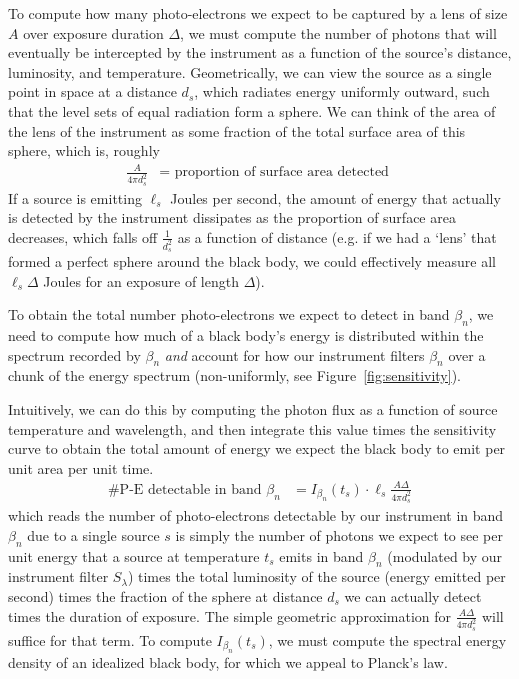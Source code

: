 \documentclass[11pt]{article}
\begin{document}
To compute how many photo-electrons we expect to be captured by a lens of size $A$ over exposure duration $\Delta$, we must compute the number of photons that will eventually be intercepted by the instrument as a function of the source's distance, luminosity, and temperature.  Geometrically, we can view the source as a single point in space at a distance $d_s$, which radiates energy uniformly outward, such that the level sets of equal radiation form a sphere.  We can think of the area of the lens of the instrument as some fraction of the total surface area of this sphere, which is, roughly
\begin{align}
  \frac{A}{4\pi d_s^2} &= \text{ proportion of surface area detected }
\end{align}
If a source is emitting $\ell_s$ Joules per second, the amount of energy that actually is detected by the instrument dissipates as the proportion of surface area decreases, which falls off $\frac{1}{d_s^2}$ as a function of distance (e.g. if we had a `lens' that formed a perfect sphere around the black body, we could effectively measure all $\ell_s \Delta$ Joules for an exposure of length $\Delta$).  

To obtain the total number photo-electrons we expect to detect in band $\beta_n$, we need to compute how much of a black body's energy is distributed within the spectrum recorded by $\beta_n$ \emph{and} account for how our instrument filters $\beta_n$ over a chunk of the energy spectrum (non-uniformly, see Figure~\ref{fig:sensitivity}).

Intuitively, we can do this by computing the photon flux as a function of source temperature and wavelength, and then integrate this value times the sensitivity curve to obtain the total amount of energy we expect the black body to emit per unit area per unit time.  
\begin{align}
  \text{\# P-E detectable in band $\beta_n$} &= I_{\beta_n}(t_s) \cdot \ell_s \frac{A \Delta}{4\pi d_s^2}  
  \label{eq:brightness}
\end{align}
which reads the number of photo-electrons detectable by our instrument in band $\beta_n$ due to a single source $s$ is simply the number of photons we expect to see per unit energy that a source at temperature $t_s$ emits in band $\beta_n$ (modulated by our instrument filter $S_\lambda$) times the total luminosity of the source (energy emitted per second) times the fraction of the sphere at distance $d_s$ we can actually detect times the duration of exposure.  The simple geometric approximation for $\frac{ A \Delta }{ 4 \pi d_s^2 }$ will suffice for that term.  To compute $I_{\beta_n}(t_s)$, we must compute the spectral energy density of an idealized black body, for which we appeal to Planck's law. 
\end{document}
